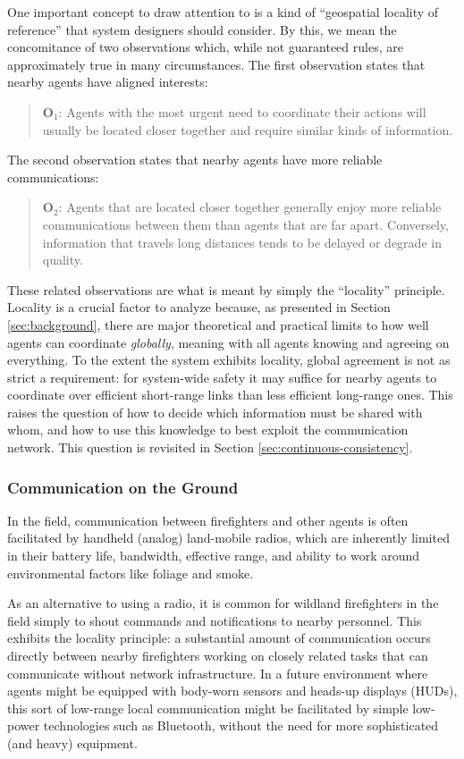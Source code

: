 \documentclass[]             %
{NASA}                       %
\theoremstyle{definition}
\begin{document}
One important concept to draw attention to is a kind of ``geospatial
locality of reference'' that system designers should consider. By
this, we mean the concomitance of two observations which, while not
guaranteed rules, are approximately true in many circumstances. The
first observation states that nearby agents have aligned interests:
\begin{quote}
  $\textbf{O}_1$: Agents with the most urgent need to coordinate their
  actions will usually be located closer together and require similar
  kinds of information.
\end{quote}
The second observation states that nearby agents have more reliable
communications:
\begin{quote}
  $\textbf{O}_2$: Agents that are located closer together generally
  enjoy more reliable communications between them than agents that are
  far apart. Conversely, information that travels long distances tends to
  be delayed or degrade in quality.
\end{quote}

These related observations are what is meant by simply the
``locality'' principle. Locality is a crucial factor to analyze
because, as presented in Section \ref{sec:background}, there are major
theoretical and practical limits to how well agents can coordinate
\emph{globally}, meaning with all agents knowing and agreeing on
everything. To the extent the system exhibits locality, global
agreement is not as strict a requirement: for system-wide safety it
may suffice for nearby agents to coordinate over efficient short-range
links than less efficient long-range ones. This raises the question of
how to decide which information must be shared with whom, and how to
use this knowledge to best exploit the communication network. This
question is revisited in Section \ref{sec:continuous-consistency}.

\subsubsection{Communication on the Ground}
\label{sssec:ground-communication}
In the field, communication between firefighters and other agents is
often facilitated by handheld (analog) land-mobile radios, which are
inherently limited in their battery life, bandwidth, effective range,
and ability to work around environmental factors like foliage and
smoke.

As an alternative to using a radio, it is common for wildland
firefighters in the field simply to shout commands and notifications
to nearby personnel. This exhibits the locality principle: a
substantial amount of communication occurs directly between nearby
firefighters working on closely related tasks that can communicate
without network infrastructure. In a future environment where agents
might be equipped with body-worn sensors and heads-up displays (HUDs),
this sort of low-range local communication might be facilitated by
simple low-power technologies such as Bluetooth, without the need for
more sophisticated (and heavy) equipment.
\end{document}
